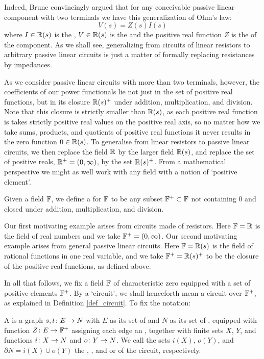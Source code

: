 Indeed, Brune convincingly argued that for any conceivable passive linear
component with two terminals we have this generalization of Ohm's law:
\[
  V(s)=Z(s)I(s)
\]
where $I \in {\mathbb{R}}(s)$ is the , $V \in {\mathbb{R}}(s)$ is the 
and the positive real function $Z$ is the  of the component.   As we shall
see, generalizing from circuits of linear resistors to arbitrary passive linear
circuits is just a matter of formally replacing resistances by impedances. 

As we consider passive linear circuits with more than two terminals, however,
the coefficients of our power functionals lie not just in the set of positive
real functions, but in its closure ${\mathbb{R}}(s)^+$ under addition, multiplication, and
division. Note that this closure is strictly smaller than ${\mathbb{R}}(s)$, as each
positive real function is takes strictly positive real values on the positive real
axis, so no matter how we take sums, products, and quotients of positive real
functions it never results in the zero function $0 \in {\mathbb{R}}(s)$.  To generalise
from linear resistors to passive linear circuits, we then replace the field ${\mathbb{R}}$
by the larger field ${\mathbb{R}}(s)$, and replace the set of positive reals, ${\mathbb{R}}^+ =
(0,\infty)$, by the set ${\mathbb{R}}(s)^+$.  From a mathematical perspective we might as
well work with any field with a notion of `positive element'.

\begin{definition} 
  Given a field ${\mathbb F}$, we define a  for ${\mathbb F}$ to be  
  any subset ${\mathbb F}^+\subset {\mathbb F}$ not containing $0$ and closed under addition,
  multiplication, and division.
\end{definition}

Our first motivating example arises from circuits made of resistors.  Here ${\mathbb F} =
{\mathbb{R}}$ is the field of real numbers and we take ${\mathbb F}^+ = (0,\infty)$.   Our second
motivating example arises from general passive linear circuits.  Here ${\mathbb F} =
{\mathbb{R}}(s)$ is the field of rational functions in one real variable, and we take
${\mathbb F}^+ = {\mathbb{R}}(s)^+$ to be the closure of the positive real functions, as defined
above.  

In all that follows, we fix a field ${\mathbb F}$ of characteristic zero equipped with a
set of positive elements ${\mathbb F}^+$.  By a `circuit', we shall henceforth mean a
circuit over ${\mathbb F}^+$, as explained in Definition \ref{def_circuit}.   To fix the
notation:

\begin{definition} \label{def_circuit_2}
A  is a graph $s,t {\colon} E \to N$ with $E$ as its set of  and $N$ as its set of , equipped with function $Z {\colon} E \to {\mathbb F}^+$ assigning each edge an , together with finite sets $X$, $Y$, and functions $i {\colon} X \to N$ and $o{\colon} Y \to  N$. We call the sets $i(X)$, $o(Y)$, and $\partial N = i(X) \cup o(Y)$ the , , and  or  of the circuit, respectively.
\end{definition}

